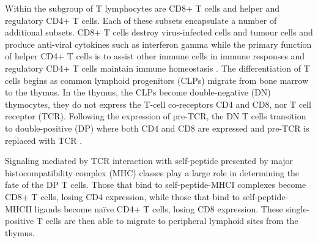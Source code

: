 

Within the subgroup of T lymphocytes are CD8+ T cells and helper and regulatory CD4+ T cells. Each of these subsets encapsulate a number of additional subsets. CD8+ T cells destroy virus-infected cells and tumour cells and produce anti-viral cytokines such as interferon gamma \cite{Sigal2016} while the primary function of helper CD4+ T cells is to assist other immune cells in immune responses and regulatory CD4+ T cells maintain immune homeostasis \cite{Xia2012}. 
The differentiation of T cells begins as common lymphoid progenitors (CLPs) migrate from bone marrow to the thymus. In the thymus, the CLPs become double-negative (DN) thymocytes, they do not express the T-cell co-receptors CD4 and CD8, nor T cell receptor (TCR). Following the expression of pre-TCR, the DN T cells transition to double-positive (DP) where both CD4 and CD8 are expressed and pre-TCR is replaced with TCR \cite{Germain2002}.

Signaling mediated by TCR interaction with self-peptide presented by major histocompatibility complex (MHC) classes play a large role in determining the fate of the DP T cells. Those that bind to self-peptide-MHCI complexes become CD8+ T cells, losing CD4 expression, while those that bind to self-peptide-MHCII ligands become naïve CD4+ T cells, losing CD8 expression. These single-positive T cells are then able to migrate to peripheral lymphoid sites from the thymus. 